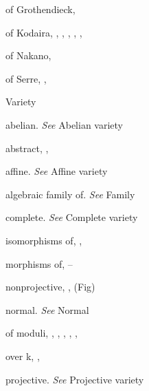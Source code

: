 {{\noindent\hspace*{7.5bp}of Grothendieck, \par
\noindent\hspace*{7.5bp}of Kodaira, , , , , , \par
\noindent\hspace*{7.5bp}of Nakano, \par
\noindent\hspace*{7.5bp}of Serre, , \par
\noindent\hspace*{0.0bp}Variety\par
\noindent\hspace*{7.5bp}abelian. \emph{See} Abelian variety\par
\noindent\hspace*{7.5bp}abstract, , \par
\noindent\hspace*{7.5bp}affine. \emph{See} Affine variety\par
\noindent\hspace*{7.5bp}algebraic family of. \emph{See} Family\par
\noindent\hspace*{7.5bp}complete. \emph{See} Complete variety\par
\noindent\hspace*{7.5bp}isomorphisms of, , \par
\noindent\hspace*{7.5bp}morphisms of, --\par
\noindent\hspace*{7.5bp}nonprojective, ,  (Fig)\par
\noindent\hspace*{7.5bp}normal. \emph{See} Normal\par
\noindent\hspace*{7.5bp}of moduli, , , , , , \par
\noindent\hspace*{7.5bp}over k, , \par
\noindent\hspace*{7.5bp}projective. \emph{See} Projective variety\par
}}
